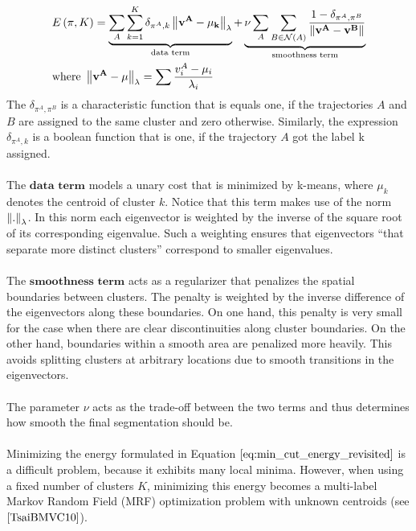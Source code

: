 \begin{equation}
\begin{aligned}
& E \left( \pi, K \right) = \underbrace{\sum_{A} \sum_{k=1}^K \delta_{\pi^A, k} \left\lVert\bf{v}^A - \mu_k\right\rVert_{\lambda}}_\text{data term} + \underbrace{\nu \sum_A \sum_{B \in \mathcal{N}(A)} \frac{1- \delta_{\pi^A, \pi^B}}{\left\lVert\bf{v}^A - \bf{v}^B\right\rVert}}_\text{smoothness term} \\
& \text{where } \left\lVert\bf{v}^A - \bf{\mu}\right\rVert_\lambda = \sum \frac{v_i^A -  \mu_i}{\lambda_i}
\end{aligned} 
\label{eq:min_cut_energy_revisited}
\end{equation}
The $\delta_{\pi^A, \pi^B}$ is a characteristic function that is equals one, if the trajectories $A$ and $B$ are assigned to the same cluster and zero otherwise. Similarly, the expression $\delta_{\pi^A, k}$ is a boolean function that is one, if the trajectory $A$ got the label k assigned. \\ \\
The $\textbf{data term}$ models a unary cost that is minimized by k-means, where $\mu_k$ denotes the centroid of cluster $k$. Notice that this term makes use of the norm $\left\lVert.\right\rVert_{\lambda}$. In this norm each eigenvector is weighted by the inverse of the square root of its corresponding eigenvalue. Such a weighting ensures that eigenvectors \enquote{that separate more distinct clusters} correspond to smaller eigenvalues. \\ \\
The $\textbf{smoothness term}$ acts as a regularizer that penalizes the spatial boundaries between clusters. The penalty is weighted by the inverse difference of the eigenvectors along these boundaries. On one hand, this penalty is very small for the case when there are clear discontinuities along cluster boundaries. On the other hand, boundaries within a smooth area are penalized more heavily. This avoids splitting clusters at arbitrary locations due to smooth transitions in the eigenvectors. \\ \\
The parameter $\nu$ acts as the trade-off between the two terms and thus determines how smooth the final segmentation should be. \\ \\
Minimizing the energy formulated in Equation $\ref{eq:min_cut_energy_revisited}$ is a difficult problem, because it exhibits many local minima. However, when using a fixed number of clusters $K$, minimizing this energy becomes a multi-label Markov Random Field (MRF) optimization problem with unknown centroids (see $\cite{TsaiBMVC10}$).
